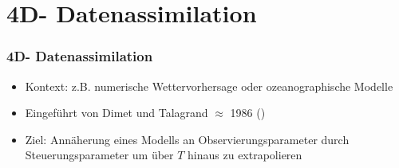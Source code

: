 \section[Datenassimilation]{4D- Datenassimilation}
\begin{frame}[<+->]
\frametitle{4D- Datenassimilation}
    \begin{itemize}
     \item Kontext: z.B. numerische Wettervorhersage oder ozeanographische Modelle
     \item Eingeführt von Dimet und Talagrand $\approx$ 1986 (\cite{dimet1986variational})
     \item Ziel: Annäherung eines Modells an Observierungsparameter durch Steuerungsparameter um über $T$ hinaus zu extrapolieren
    \end{itemize}
%     

\end{frame}

